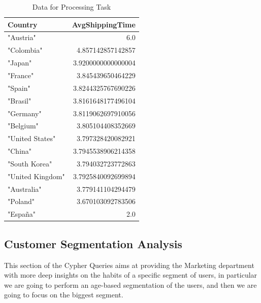\documentclass[a4paper,12pt]{article}
\begin{document}
\begin{table}[h!]
  \centering
  \caption{Data for Processing Task}
  \label{tab:processing_data}
  \begin{tabular}{l r}
      \toprule
      \textbf{Country} & \textbf{AvgShippingTime} \\
      \midrule
      "Austria" &	6.0\\
      "Colombia" & 4.857142857142857 \\
      "Japan" & 3.9200000000000004 \\
      "France" & 3.845439650464229 \\
      "Spain" & 3.8244325767690226 \\
      "Brasil" & 3.8161648177496104 \\
      "Germany" & 3.8119062697910056 \\
      "Belgium" & 3.805104408352669 \\
      "United States" & 3.797328420082921 \\
      "China" & 3.7945538906214358 \\
      "South Korea" & 3.794032723772863 \\
      "United Kingdom" & 3.7925840092699894 \\
      "Australia" & 3.779141104294479 \\
      "Poland" & 3.670103092783506 \\
      "España" & 2.0 \\
      \bottomrule
  \end{tabular}
\end{table}

\subsection{Customer Segmentation Analysis}
This section of the Cypher Queries aims at providing the Marketing department with more deep insights on the habits of a specific segment of users,
in particular we are going to perform an age-based segmentation of the users, and then we are going to focus on the biggest segment.
\end{document}

